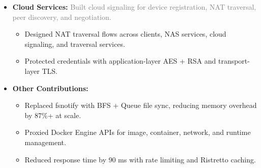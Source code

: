 \documentclass{styles/resume}
\begin{document}
\begin{itemize}
     \item \textbf{Cloud Services:}
    {\small
    \noindent\textcolor{gray}{Built cloud signaling for device registration, NAT traversal, peer discovery, and negotiation.}
    }
    \vspace{0.2ex}
    \begin{itemize}
        \item Designed NAT traversal flows across clients, NAS services, cloud signaling, and traversal services.
        \item Protected credentials with application-layer AES + RSA and transport-layer TLS.
    \end{itemize}
    \vspace{1ex}

    \item \textbf{Other Contributions:}
    \begin{itemize}
        \item Replaced fsnotify with BFS + Queue file sync, reducing memory overhead by 87\%+ at scale.
        \item Proxied Docker Engine APIs for image, container, network, and runtime management.
        \item Reduced response time by 90 ms with rate limiting and Ristretto caching.
    \end{itemize}

\end{itemize}
\end{document}
